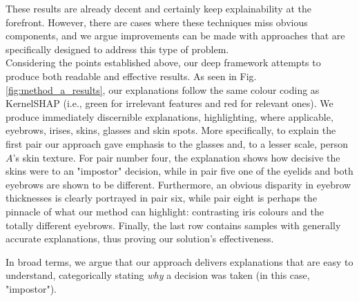 These results are already decent and certainly keep explainability at the forefront. However, there are cases where these techniques miss obvious components, and we argue improvements can be made with approaches that are specifically designed to address this type of problem. \\

Considering the points established above, our deep framework attempts to produce both readable and effective results. As seen in Fig. \ref{fig:method_a_results}, our explanations follow the same colour coding as Kernel\ac{SHAP} (i.e., green for irrelevant features and red for relevant ones). We produce immediately discernible explanations, highlighting, where applicable, eyebrows, irises, skins, glasses and skin spots. More specifically, to explain the first pair our approach gave emphasis to the glasses and, to a lesser scale, person $A$'s skin texture. For pair number four, the explanation shows how decisive the skins were to an "impostor" decision, while in pair five one of the eyelids and both eyebrows are shown to be different. Furthermore, an obvious disparity in eyebrow thicknesses is clearly portrayed in pair six, while pair eight is perhaps the pinnacle of what our method can highlight: contrasting iris colours and the totally different eyebrows. Finally, the last row contains samples with generally accurate explanations, thus proving our solution's effectiveness.

In broad terms, we argue that our approach delivers explanations that are easy to understand, categorically stating \emph{why} a decision was taken (in this case, "impostor"). 

